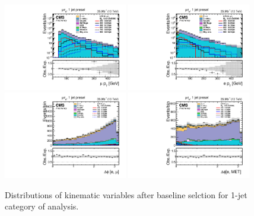 \begin{figure}[htbp]
     \centering
     \includegraphics[width=0.48\textwidth]{plots_and_figures/chapter5/preselection_HM/log_mutaue_1jet_presel_mPt.pdf}
     \includegraphics[width=0.48\textwidth]{plots_and_figures/chapter5/preselection_HM/log_mutaue_1jet_presel_ePt.pdf}\\
     \includegraphics[width=0.48\textwidth]{plots_and_figures/chapter5/preselection_HM/mutaue_1jet_presel_dphiemu.pdf}
     \includegraphics[width=0.48\textwidth]{plots_and_figures/chapter5/preselection_HM/mutaue_1jet_presel_dphiEMet.pdf}\\
     \caption{Distributions of kinematic variables after baseline selction for 1-jet category of \Hmue analysis.}
     \label{fig:Hmutaue_presel2}
\end{figure}



